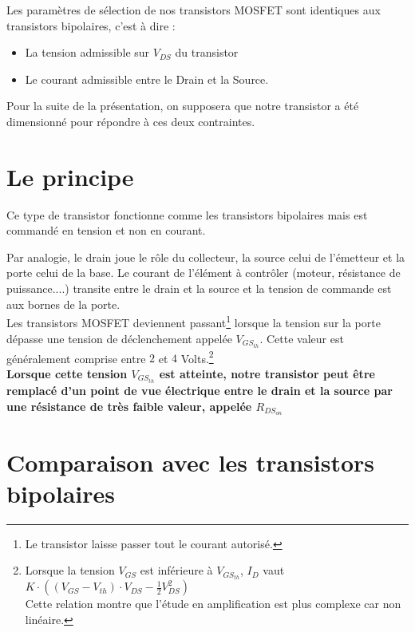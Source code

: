 \documentclass[12pt]{report}
\renewcommand{\bold}[1]{\textbf{#1}}
\begin{document}
     Les paramètres de sélection de nos transistors MOSFET sont identiques aux transistors bipolaires, c'est à dire :
     
     \begin{itemize}
     
       \item La tension admissible sur $V_{DS}$ du transistor
       \item Le courant admissible entre le Drain et la Source.
     \end{itemize}
     
     Pour la suite de la présentation, on supposera que notre transistor a été dimensionné pour répondre à ces deux contraintes.


     \section{Le principe}

     Ce type de transistor fonctionne comme les transistors bipolaires mais est commandé en tension et non en courant.

     Par analogie, le drain joue le rôle du collecteur, la source celui de l'émetteur et la porte celui de la base.
     Le courant de l'élément à contrôler (moteur, résistance de puissance....) transite entre le drain et la source et la tension de commande est aux bornes de la porte.\\
     
     Les transistors MOSFET deviennent passant\footnote{Le transistor laisse passer tout le courant autorisé.} lorsque la tension sur la porte dépasse une tension de déclenchement appelée $V_{GS_{th}}$.
     Cette valeur est généralement comprise entre $2$ et $4$ Volts.\footnote{Lorsque la tension $V_{GS}$ est inférieure à $V_{GS_{th}}$, $I_D$ vaut $K \cdot ( (V_{GS}-V_{th})\cdot V_{DS}-\frac{1}{2}V_{DS}^2)$ \\Cette relation montre que l'étude en amplification est plus complexe car non linéaire.}\\

     \bold{Lorsque cette tension $V_{GS_{th}}$ est atteinte, notre transistor peut être remplacé d'un point de vue électrique entre le drain et la source par une résistance de très faible valeur, appelée $R_{DS_{on}}$}

    \section{Comparaison avec les transistors bipolaires}
\end{document}
